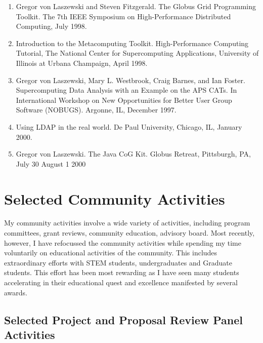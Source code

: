 \documentclass{article}
\begin{document}
\begin{enumerate}
\item  Gregor von Laszewski and Steven Fitzgerald. The Globus Grid Programming Toolkit. The 7th IEEE Symposium on High-Performance Distributed Computing, July 1998. 
\item  Introduction to the Metacomputing Toolkit. High-Performance Computing Tutorial, The National Center for Supercomputing Applications, University of Illinois at Urbana Champaign, April 1998. 
\item  Gregor von Laszewski, Mary L. Westbrook, Craig Barnes, and Ian Foster. Supercomputing Data Analysis with an Example on the APS CATs. In International Workshop on New Opportunities for Better User Group Software (NOBUGS). Argonne, IL, December 1997. %
\item  Using LDAP in the real world. De Paul University, Chicago, IL, January 2000. 
\item  Gregor von Laszewski. The Java CoG Kit. Globus Retreat, Pittsburgh, PA, July 30 August 1 2000 
\end{enumerate}
 
\section{Selected Community Activities}

My community activities involve a wide variety of activities, including
program committees, grant reviews, community education, advisory
board. Most recently, however, I have refocussed the community activities while
spending my time voluntarily on educational activities of the
community. This includes extraordinary efforts with STEM students,
undergraduates and Graduate students. This effort has been most
rewarding as I have seen many students accelerating in their
educational quest and excellence manifested by several awards.

\subsection{Selected Project and Proposal Review Panel Activities} 
\end{document}
